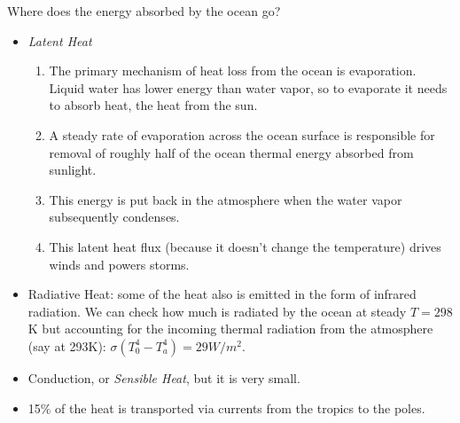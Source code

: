 \documentclass[11pt]{book}
\newcommand\bei{\begin{itemize}}
\newcommand\eei{\end{itemize}}
\newcommand\bee{\begin{enumerate}}
\newcommand\eee{\end{enumerate}}
\newcommand\lecture[1]{\newpage
\addtocounter{lectureno}{1}
\setcounter{secno}{0}
\begin{center}
 {\bf Lecture \arabic{lectureno}: #1}
\end{center}
}
\newcounter{lectureno}
\newcounter{secno}
\begin{document}
Where does the energy absorbed by the ocean go? 
\bei
\item {\it Latent Heat} 
\bee
\item The primary mechanism of heat loss from the ocean is evaporation. Liquid water has lower energy than water vapor, so to evaporate it needs to absorb heat, the heat from the sun. 
\item A steady rate of evaporation across the ocean surface is responsible for removal of roughly half of the ocean thermal energy absorbed from sunlight. 
\item This energy is put back in the atmosphere when the water vapor subsequently condenses. 
\item This latent heat flux (because it doesn't change the temperature) drives winds and powers storms.
\eee
\item Radiative Heat: some of the heat also is emitted in the form of infrared radiation. We can check how much is radiated by the ocean at steady $T=298$K but accounting for the incoming thermal radiation from the atmosphere (say at 293K): $\sigma (T_0^4-T_a^4)= 29W/m^2$.
\item Conduction, or {\it Sensible Heat}, but it is very small.
\item 15\% of the heat is transported via currents from the tropics to the poles.
\eei

\end{document}
